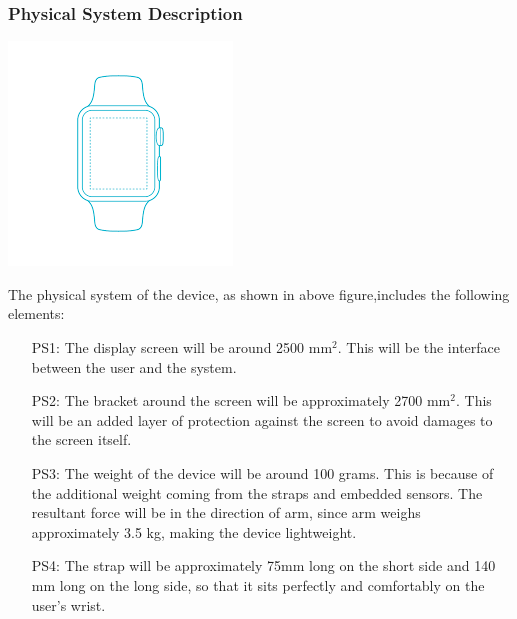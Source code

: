 \documentclass[12pt]{article}
\begin{document}
\subsubsection{Physical System Description} \label{sec_phySystDescrip}

\begin{center}
	\includegraphics[]{watch.png}
\end{center}
The physical system of the device, as shown in above figure,includes the following elements:

\begin{itemize}

  \item[PS1:] The display screen will be around 2500 mm$^2$. This will be the interface between the user and the system.
  \item[PS2:] The bracket around the screen will be approximately 2700 mm$^2$. This will be an added layer of protection against the screen to avoid damages to the screen itself.
  \item[PS3:] The weight of the device will be around 100 grams. This is because of the additional weight coming from the straps and embedded sensors. The resultant force will be in the direction of arm, since arm weighs approximately 3.5 kg, making the device lightweight.
  \item[PS4:] The strap will be approximately 75mm long on the short side and 140 mm long on the long side, so that it sits perfectly and comfortably on the user's wrist.

\end{itemize}
\end{document}
